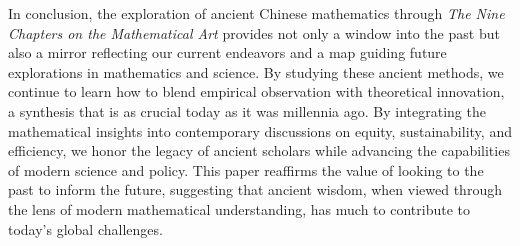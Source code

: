 \documentclass[10pt]{article}
\begin{document}
\vspace{7pt}

In conclusion, the exploration of ancient Chinese mathematics through \textit{The Nine Chapters on the Mathematical Art} provides not only a window into the past but also a mirror reflecting our current endeavors and a map guiding future explorations in mathematics and science. By studying these ancient methods, we continue to learn how to blend empirical observation with theoretical innovation, a synthesis that is as crucial today as it was millennia ago. By integrating the mathematical insights into contemporary discussions on equity, sustainability, and efficiency, we honor the legacy of ancient scholars while advancing the capabilities of modern science and policy. This paper reaffirms the value of looking to the past to inform the future, suggesting that ancient wisdom, when viewed through the lens of modern mathematical understanding, has much to contribute to today’s global challenges.


\vspace{15pt}


\newpage
\printbibliography
\end{document}
